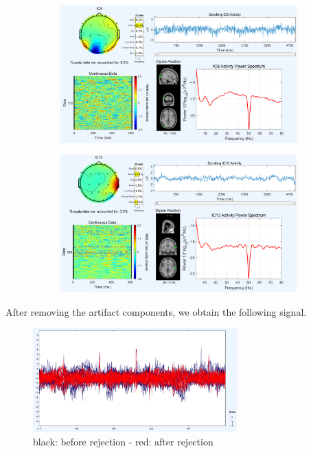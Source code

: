 \documentclass[hidelinks,12pt]{article}
\begin{document}
		\begin{figure}[!h]
			\centering
			\begin{subfigure}{0.45\textwidth}
				\centering
				\includegraphics[width=\linewidth]{hc/8}
			\end{subfigure}
			\hfill
			\begin{subfigure}{0.45\textwidth}
				\centering
				\includegraphics[width=\linewidth]{hc/13}
			\end{subfigure}
		\end{figure}
	
	After removing the artifact components, we obtain the following signal.
	
	\begin{figure}[h!]
		\centering
		\includegraphics[width=0.7\textwidth]{25}
		\caption{black: before rejection - red: after rejection}
	\end{figure}
	
\end{document}
